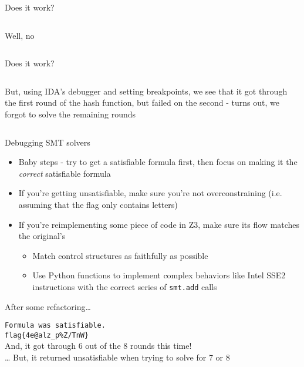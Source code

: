 \begin{frame}{Does it work?}
    \begin{columns}
        Well, no

         \\
    \end{columns}
\end{frame}

\begin{frame}{Does it work?}
    \begin{columns}
        But, using IDA's debugger and setting breakpoints, we see that it
        got through the first round of the hash function, but failed on the
        second - turns out, we forgot to solve the remaining rounds

    \end{columns}
\end{frame}

\begin{frame}{Debugging SMT solvers}
    \begin{itemize}
        \item<1-> Baby steps - try to get a satisfiable formula first, then
                  focus on making it the {\em correct} satisfiable formula
        \item<2-> If you're getting unsatisfiable, make sure you're not
                  overconstraining (i.e. assuming that the flag only contains
                  letters)
        \item<3-> If you're reimplementing some piece of code in Z3, make sure
                  its flow matches the original's
        \begin{itemize}
            \item<4-> Match control structures as faithfully as possible
            \item<5-> Use Python functions to implement complex behaviors like
                      Intel SSE2 instructions with the correct series of 
                      \texttt{smt.add} calls
        \end{itemize}
    \end{itemize}
\end{frame}

\begin{frame}{After some refactoring\ldots}
    \begin{center}
        {\Large
            \texttt{Formula was satisfiable.} \\
            \texttt{flag\{4e@alz\_p\%Z/TnW\}} \pause \\
            \vspace{0.5in}
            And, it got through 6 out of the 8 rounds this time! \pause \\
            \ldots\xspace But, it returned unsatisfiable when trying to solve
            for 7 or 8
        }
    \end{center}
\end{frame}

